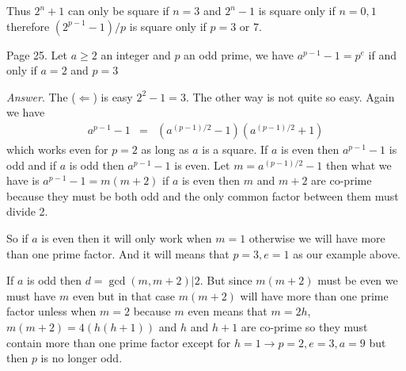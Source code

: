 \documentclass[aps,preprint,preprintnumbers,nofootinbib,showpacs,prd]{revtex4-1}
\newcommand{\nbea}{\begin{eqnarray*}}
\newcommand{\neea}{\end{eqnarray*}}
\begin{document}
Thus $2^n + 1$ can only be square if $n = 3$ and $2^n - 1$ is square only if $n = 0, 1$ therefore $(2^{p-1} - 1)/p$ is square only if $p = 3$ or $7$.

Page 25. Let $a \ge 2$ an integer and $p$ an odd prime, we have $a^{p-1} - 1 = p^e$ if and only if $a = 2$ and $p = 3$

{\it Answer}. The ($\Leftarrow$) is easy $2^2 - 1 = 3$. The other way is not quite so easy. Again we have 
%
\nbea
a^{p-1} - 1 & = & (a^{(p-1)/2} - 1)(a^{(p-1)/2} + 1)
\neea
%
which works even for $p=2$ as long as $a$ is a square. If $a$ is even then $a^{p-1} - 1$ is odd and if $a$ is odd then $a^{p-1} - 1$ is even. Let $m = a^{(p-1)/2} - 1$ then what we have is $a^{p-1} - 1 = m(m+2)$ if $a$ is even then $m$ and $m + 2$ are co-prime because they must be both odd and the only common factor between them must divide 2. 

So if $a$ is even then it will only work when $m = 1$ otherwise we will have more than one prime factor. And it will means that $p=3, e=1$ as our example above.

If $a$ is odd then $d = \gcd(m, m+2) | 2$. But since $m(m+2)$ must be even we must have $m$ even but in that case $m(m + 2)$ will have more than one prime factor unless when $m = 2$ because $m$ even means that $m=2h$, $m(m + 2) = 4(h(h + 1))$ and $h$ and $h + 1$ are co-prime so they must contain more than one prime factor except for $h = 1 \to p = 2, e = 3, a = 9$ but then $p$ is no longer odd.
\end{document}
